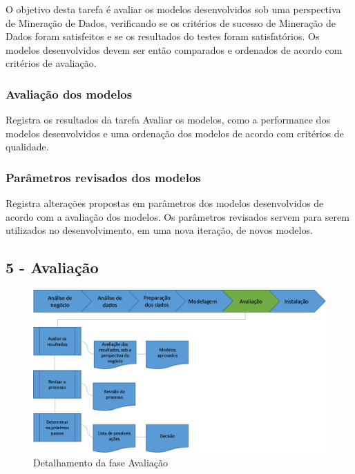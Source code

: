 O objetivo desta tarefa é avaliar os modelos desenvolvidos sob uma perspectiva de Mineração de Dados, verificando se os critérios de sucesso de Mineração de Dados foram satisfeitos e se os resultados do testes foram satisfatórios. Os modelos desenvolvidos devem ser então comparados e ordenados de acordo com critérios de avaliação.

\subsubsection*{Avaliação dos modelos}

Registra os resultados da tarefa Avaliar os modelos, como a performance dos modelos desenvolvidos e uma ordenação dos modelos de acordo com critérios de qualidade.

\subsubsection*{Parâmetros revisados dos modelos}

Registra alterações propostas em parâmetros dos modelos desenvolvidos de acordo com a avaliação dos modelos. Os parâmetros revisados servem para serem utilizados no desenvolvimento, em uma nova iteração, de novos modelos.

\newpage 

\subsection*{5 - Avaliação}


\begin{figure}[H]
	\includegraphics[scale=0.8]{img/CRISP-DM-Avaliacao.png}
	\caption{Detalhamento da fase Avaliação}
	\label{img:CRISP-DM-Avaliacao}
\end{figure}

